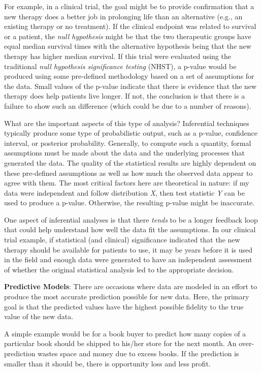 \documentclass[11pt]{book}
\begin{document}
For example, in a clinical trial, the goal might be to provide confirmation that a new therapy does a better job in prolonging life than an alternative (e.g., an existing therapy or no treatment). If the clinical endpoint was related to survival or a patient, the \emph{null hypothesis} might be that the two therapeutic groups have equal median survival times with the alternative hypothesis being that the new therapy has higher median survival. If this trial were evaluated using the traditional \emph{null hypothesis significance testing} (NHST), a p-value would be produced using some pre-defined methodology based on a set of assumptions for the data. Small values of the p-value indicate that there is evidence that the new therapy does help patients live longer. If not, the conclusion is that there is a failure to show such an difference (which could be due to a number of reasons).

What are the important aspects of this type of analysis? Inferential techniques typically produce some type of probabilistic output, such as a p-value, confidence interval, or posterior probability. Generally, to compute such a quantity, formal assumptions must be made about the data and the underlying processes that generated the data. The quality of the statistical results are highly dependent on these pre-defined assumptions as well as how much the observed data appear to agree with them. The most critical factors here are theoretical in nature: if my data were independent and follow distribution \emph{X}, then test statistic \emph{Y} can be used to produce a p-value. Otherwise, the resulting p-value might be inaccurate.

One aspect of inferential analyses is that there \emph{tends} to be a longer feedback loop that could help understand how well the data fit the assumptions. In our clinical trial example, if statistical (and clinical) significance indicated that the new therapy should be available for patients to use, it may be years before it is used in the field and enough data were generated to have an independent assessment of whether the original statistical analysis led to the appropriate decision.

\textbf{Predictive Models}: There are occasions where data are modeled in an effort to produce the most accurate prediction possible for new data. Here, the primary goal is that the predicted values have the highest possible fidelity to the true value of the new data.

A simple example would be for a book buyer to predict how many copies of a particular book should be shipped to his/her store for the next month. An over-prediction wastes space and money due to excess books. If the prediction is smaller than it should be, there is opportunity loss and less profit.
\end{document}
